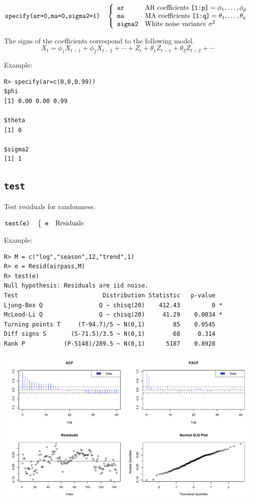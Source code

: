 \documentclass[11pt]{article}
\begin{document}
\bigskip
$
\hbox{\tt specify(ar=0,ma=0,sigma2=1)}\quad\left\{\begin{array}{ll}
{\tt ar} & \hbox{AR coefficients \tt[1:p]}=\phi_1,\ldots,\phi_p\\
{\tt ma} & \hbox{MA coefficients \tt[1:q]}=\theta_1,\ldots,\theta_q\\
{\tt sigma2} & \hbox{White noise variance $\sigma^2$}
\end{array}\right.
$

\bigskip
\noindent
The signs of the coefficients correspond to the following model.
\[
X_t=\phi_1X_{t-1}+\phi_2X_{t-2}+\cdots+Z_t+\theta_1Z_{t-1}+\theta_2Z_{t-2}+\cdots
\]

\noindent
Example:

\begin{verbatim}
R> specify(ar=c(0,0,0.99))
$phi
[1] 0.00 0.00 0.99

$theta
[1] 0

$sigma2
[1] 1
\end{verbatim}

\newpage

\subsection{\tt test}
Test residuals for randomness.

\bigskip
$
\hbox{\tt test(e)}\quad\left\{\begin{array}{ll}
{\tt e} & \hbox{Residuals}
\end{array}\right.
$

\bigskip
\noindent
Example:

\begin{verbatim}
R> M = c("log","season",12,"trend",1)
R> e = Resid(airpass,M)
R> test(e)
Null hypothesis: Residuals are iid noise.
Test                        Distribution Statistic   p-value
Ljung-Box Q                Q ~ chisq(20)    412.43         0 *
McLeod-Li Q                Q ~ chisq(20)     41.29    0.0034 *
Turning points T     (T-94.7)/5 ~ N(0,1)        85    0.0545
Diff signs S       (S-71.5)/3.5 ~ N(0,1)        68     0.314
Rank P           (P-5148)/289.5 ~ N(0,1)      5187    0.8928
\end{verbatim}

\begin{center}
\includegraphics[scale=0.4]{Rplot-33.pdf}
\end{center}
\end{document}
